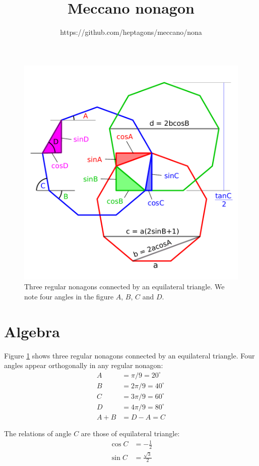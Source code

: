 \documentclass[11pt]{article}
\title{\textbf{Meccano nonagon}}
\author{https://github.com/heptagons/meccano/nona}
\date{}
\begin{document}
\maketitle

\begin{figure}[h]
\centering
\includegraphics[scale=0.7]{figs/3nonagons}
\caption{Three regular nonagons connected by an equilateral triangle.
We note four angles in the figure $A$, $B$, $C$ and $D$.}
\label{fig:nonagons}
\end{figure}

\section{Algebra}

Figure \ref{fig:nonagons} shows three regular nonagons connected by an equilateral 
triangle. Four angles appear orthogonally in any regular nonagon:
\begin{align}
A &= \pi/9 = 20^{\circ} \\
B &= 2\pi/9 = 40^{\circ} \\
C &= 3\pi/9 = 60^{\circ} \\
D &= 4\pi/9 = 80^{\circ} \\
A + B &= D - A = C
\end{align}

The relations of angle $C$ are those of equilateral triangle:
\begin{align}
\cos{C} &= -\frac{1}{2}\\
\sin{C} &= \frac{\sqrt{3}}{2}
\end{align}
\end{document}
